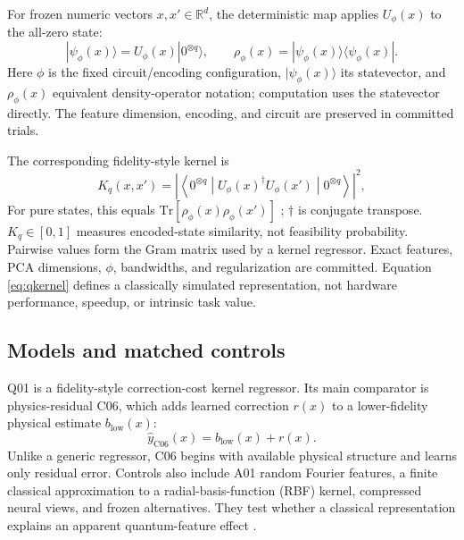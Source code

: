 For frozen numeric vectors $x,x'\in\mathbb{R}^{d}$, the deterministic map
applies $U_{\phi}(x)$ to the all-zero state:
\begin{equation}
|\psi_{\phi}(x)\rangle = U_{\phi}(x)|0^{\otimes q}\rangle,
\qquad
\rho_{\phi}(x)=|\psi_{\phi}(x)\rangle\langle\psi_{\phi}(x)|.
\label{eq:feature-state}
\end{equation}
Here $\phi$ is the fixed circuit/encoding configuration,
$|\psi_{\phi}(x)\rangle$ its statevector, and $\rho_{\phi}(x)$ equivalent
density-operator notation; computation uses the statevector directly. The
feature dimension, encoding, and circuit are preserved in committed trials.

The corresponding fidelity-style kernel is
\begin{equation}
K_q(x,x')=
\left|\left\langle 0^{\otimes q}\middle|
U_{\phi}(x)^{\dagger}U_{\phi}(x')
\middle|0^{\otimes q}\right\rangle\right|^2,
\label{eq:qkernel}
\end{equation}
For pure states, this equals
$\mathrm{Tr}[\rho_{\phi}(x)\rho_{\phi}(x')]$ \cite{schuld2019,havlicek2019};
$\dagger$ is conjugate transpose. $K_q\in[0,1]$ measures encoded-state
similarity, not feasibility probability. Pairwise values form the Gram matrix
used by a kernel regressor. Exact features, PCA dimensions, $\phi$, bandwidths,
and regularization are committed. Equation \eqref{eq:qkernel} defines a
classically simulated representation, not hardware performance, speedup, or
intrinsic task value.

\subsection{Models and matched controls}

Q01 is a fidelity-style correction-cost kernel regressor. Its main comparator
is physics-residual C06, which adds learned correction $r(x)$ to a
lower-fidelity physical estimate $b_{\mathrm{low}}(x)$:
\begin{equation}
\widehat{y}_{\mathrm{C06}}(x)=b_{\mathrm{low}}(x)+r(x).
\label{eq:c06}
\end{equation}
Unlike a generic regressor, C06 begins with available physical structure and
learns only residual error. Controls also include A01 random Fourier features,
a finite classical approximation to a radial-basis-function (RBF) kernel,
compressed neural views, and frozen alternatives. They test whether a classical
representation explains an apparent quantum-feature effect
\cite{steffen2025,xie2022,rahimi2007}.

